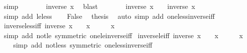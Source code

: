 \begin{isabellebody}
\ simp\isanewline
\ \ \isamarkupfalse%
\ \isamarkupfalse%
\ {\isachardoublequoteopen}{}\ {\isasymnoteq}\ inverse\ x{\isachardoublequoteclose}\ \isamarkupfalse%
\ blast\isanewline
\ \ \isamarkupfalse%
\ \isamarkupfalse%
\ {\isachardoublequoteopen}{}\ {\isasymle}\ inverse\ x\ {\isasymlongleftrightarrow}\ {}\ {\isacharless}{\kern0pt}\ inverse\ x{\isachardoublequoteclose}\ \isamarkupfalse%
\ {\isacharparenleft}{\kern0pt}simp\ add{\isacharcolon}{\kern0pt}\ le{\isacharunderscore}{\kern0pt}less{\isacharparenright}{\kern0pt}\isanewline
\ \ \isamarkupfalse%
\ False\ \isamarkupfalse%
\ {\isacharquery}{\kern0pt}thesis\ \isamarkupfalse%
\ {\isacharparenleft}{\kern0pt}auto\ simp\ add{\isacharcolon}{\kern0pt}\ one{\isacharunderscore}{\kern0pt}less{\isacharunderscore}{\kern0pt}inverse{\isacharunderscore}{\kern0pt}iff{\isacharparenright}{\kern0pt}\isanewline
{}\isamarkupfalse%
%
\endisatagproof
{\isafoldproof}%
%
\isadelimproof
\isanewline
%
\endisadelimproof
\isanewline
{}\isamarkupfalse%
\ inverse{\isacharunderscore}{\kern0pt}less{\isacharunderscore}{\kern0pt}{}{\isacharunderscore}{\kern0pt}iff{\isacharcolon}{\kern0pt}\ {\isachardoublequoteopen}inverse\ x\ {\isacharless}{\kern0pt}\ {}\ {\isasymlongleftrightarrow}\ x\ {\isasymle}\ {}\ {\isasymor}\ {}\ {\isacharless}{\kern0pt}\ x{\isachardoublequoteclose}\isanewline
%
\isadelimproof
\ \ %
\endisadelimproof
%
\isatagproof
{}\isamarkupfalse%
\ {\isacharparenleft}{\kern0pt}simp\ add{\isacharcolon}{\kern0pt}\ not{\isacharunderscore}{\kern0pt}le\ {\isacharbrackleft}{\kern0pt}symmetric{\isacharbrackright}{\kern0pt}\ one{\isacharunderscore}{\kern0pt}le{\isacharunderscore}{\kern0pt}inverse{\isacharunderscore}{\kern0pt}iff{\isacharparenright}{\kern0pt}%
\endisatagproof
{\isafoldproof}%
%
\isadelimproof
\isanewline
%
\endisadelimproof
\isanewline
{}\isamarkupfalse%
\ inverse{\isacharunderscore}{\kern0pt}le{\isacharunderscore}{\kern0pt}{}{\isacharunderscore}{\kern0pt}iff{\isacharcolon}{\kern0pt}\ {\isachardoublequoteopen}inverse\ x\ {\isasymle}\ {}\ {\isasymlongleftrightarrow}\ x\ {\isasymle}\ {}\ {\isasymor}\ {}\ {\isasymle}\ x{\isachardoublequoteclose}\isanewline
%
\isadelimproof
\ \ %
\endisadelimproof
%
\isatagproof
{}\isamarkupfalse%
\ {\isacharparenleft}{\kern0pt}simp\ add{\isacharcolon}{\kern0pt}\ not{\isacharunderscore}{\kern0pt}less\ {\isacharbrackleft}{\kern0pt}symmetric{\isacharbrackright}{\kern0pt}\ one{\isacharunderscore}{\kern0pt}less{\isacharunderscore}{\kern0pt}inverse{\isacharunderscore}{\kern0pt}iff{\isacharparenright}{\kern0pt}%

\end{isabellebody}
